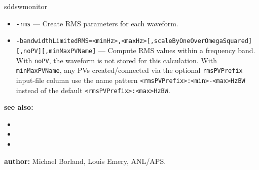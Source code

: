 \begin{sddsprog}{sddswmonitor}
\begin{itemize}
          Define the physical quantity represented by the waveform index.
  \item {\tt -rms} --- Create RMS parameters for each waveform.
  \item {\tt -bandwidthLimitedRMS=<minHz>,<maxHz>[,scaleByOneOverOmegaSquared][,noPV][,minMaxPVName]} ---
          Compute RMS values within a frequency band. With \verb+noPV+, the
          waveform is not stored for this calculation. With \verb+minMaxPVName+,
          any PVs created/connected via the optional \verb+rmsPVPrefix+ input-file
          column use the name pattern \verb+<rmsPVPrefix>:<min>-<max>HzBW+ instead
          of the default \verb+<rmsPVPrefix>:<max>HzBW+.
\end{itemize}

\item \textbf{see also:}
\begin{itemize}
  \item {}
  \item {}
  \item {}
\end{itemize}
\item \textbf{author:} Michael Borland, Louis Emery, ANL/APS.
\end{sddsprog}
